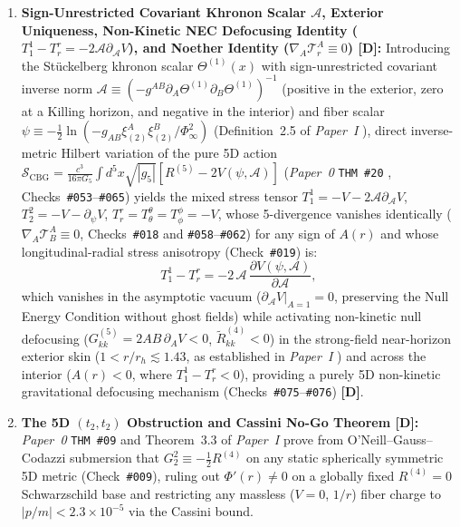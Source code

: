 \documentclass[11pt,a4paper]{article}
\newcommand{\catD}{\textbf{\textcolor{blue!75!black}{[D]}}}
\theoremstyle{plain}
\theoremstyle{definition}
\theoremstyle{remark}
\numberwithin{equation}{section}
\begin{document}
\begin{enumerate}
    \item \textbf{Sign-Unrestricted Covariant Khronon Scalar $\mathcal{A}$, Exterior Uniqueness, Non-Kinetic NEC Defocusing Identity ($T^1_1 - T^r_r = -2\mathcal{A}\partial_{\mathcal{A}}V$), and Noether Identity ($\nabla_A \mathcal{T}^A_r \equiv 0$) \catD:} Introducing the St\"uckelberg khronon scalar $\Theta^{(1)}(x)$ with sign-unrestricted covariant inverse norm $\mathcal{A} \equiv (-g^{AB}\partial_A\Theta^{(1)}\partial_B\Theta^{(1)})^{-1}$ (positive in the exterior, zero at a Killing horizon, and negative in the interior) and fiber scalar $\psi \equiv -\frac{1}{2}\ln(-g_{AB}\xi_{(2)}^A\xi_{(2)}^B/\Phi_{\infty}^2)$ (Definition~2.5 of \textit{Paper~I} \cite{jimenez2026a}), direct inverse-metric Hilbert variation of the pure 5D action $\mathcal{S}_{\text{CBG}} = \frac{c^3}{16\pi G_5}\int d^5x\sqrt{|g_5|}[R^{(5)} - 2V(\psi,\mathcal{A})]$ (\textit{Paper~0} \texttt{THM~\#20} \cite{jimenez2026_p0}, Checks~\texttt{\#053}--\texttt{\#065}) yields the mixed stress tensor $T^1_1 = -V - 2\mathcal{A}\partial_{\mathcal{A}}V$, $T^2_2 = -V - \partial_{\psi}V$, $T^r_r = T^{\theta}_{\theta} = T^{\phi}_{\phi} = -V$, whose 5-divergence vanishes identically ($\nabla_A \mathcal{T}^A_B \equiv 0$, Checks~\texttt{\#018} and \texttt{\#058}--\texttt{\#062}) for any sign of $A(r)$ and whose longitudinal-radial stress anisotropy (Check~\texttt{\#019}) is:
    \begin{equation}
    T^1_1 - T^r_r = -2\,\mathcal{A}\,\frac{\partial V(\psi, \mathcal{A})}{\partial\mathcal{A}},
    \label{eq:nec_anisotropy_identity}
    \end{equation}
    which vanishes in the asymptotic vacuum ($\partial_{\mathcal{A}}V|_{A=1} = 0$, preserving the Null Energy Condition without ghost fields) while activating non-kinetic null defocusing ($G^{(5)}_{kk} = 2AB\,\partial_A V < 0$, $\tilde{R}^{(4)}_{kk} < 0$) in the strong-field near-horizon exterior skin ($1 < r/r_h \lesssim 1.43$, as established in \textit{Paper~I} \cite{jimenez2026a}) and across the interior ($A(r) < 0$, where $T^1_1 - T^r_r < 0$), providing a purely 5D non-kinetic gravitational defocusing mechanism (Checks~\texttt{\#075}--\texttt{\#076}) \catD.

    \item \textbf{The 5D $(t_2,t_2)$ Obstruction and Cassini No-Go Theorem \catD:} \textit{Paper~0} \texttt{THM~\#09} \cite{jimenez2026_p0} and Theorem~3.3 of \textit{Paper~I} \cite{jimenez2026a} prove from O'Neill--Gauss--Codazzi submersion that $G^2_2 \equiv -\frac{1}{2}R^{(4)}$ on any static spherically symmetric 5D metric (Check~\texttt{\#009}), ruling out $\Phi'(r) \neq 0$ on a globally fixed $R^{(4)} = 0$ Schwarzschild base and restricting any massless ($V = 0$, $1/r$) fiber charge to $|p/m| < 2.3 \times 10^{-5}$ via the Cassini bound.


\end{enumerate}
\end{document}
